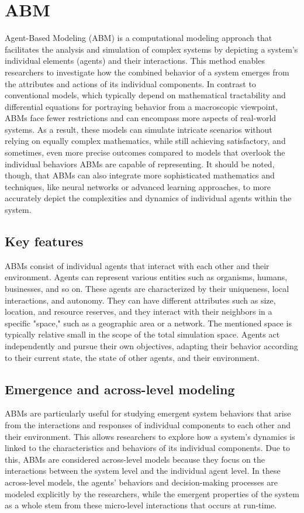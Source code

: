 \section{ABM}
    Agent-Based Modeling (ABM) is a computational modeling approach that facilitates the analysis and simulation of complex systems by depicting a system's individual elements (agents) and their interactions. This method enables researchers to investigate how the combined behavior of a system emerges from the attributes and actions of its individual components. In contrast to conventional models, which typically depend on mathematical tractability and differential equations for portraying behavior from a macroscopic viewpoint, ABMs face fewer restrictions and can encompass more aspects of real-world systems. As a result, these models can simulate intricate scenarios without relying on equally complex mathematics, while still achieving satisfactory, and sometimes, even more precise outcomes compared to models that overlook the individual behaviors ABMs are capable of representing. It should be noted, though, that ABMs can also integrate more sophisticated mathematics and techniques, like neural networks or advanced learning approaches, to more accurately depict the complexities and dynamics of individual agents within the system.

\subsection{Key features}
    ABMs consist of individual agents that interact with each other and their environment. Agents can represent various entities such as organisms, humans, businesses, and so on. These agents are characterized by their uniqueness, local interactions, and autonomy. They can have different attributes such as size, location, and resource reserves, and they interact with their neighbors in a specific "space," such as a geographic area or a network. The mentioned space is typically relative small in the scope of the total simulation space. Agents act independently and pursue their own objectives, adapting their behavior according to their current state, the state of other agents, and their environment.

\subsection{Emergence and across-level modeling}
    ABMs are particularly useful for studying emergent system behaviors that arise from the interactions and responses of individual components to each other and their environment. This allows researchers to explore how a system's dynamics is linked to the characteristics and behaviors of its individual components. Due to this, ABMs are considered across-level models because they focus on the interactions between the system level and the individual agent level. In these across-level models, the agents' behaviors and decision-making processes are modeled explicitly by the researchers, while the emergent properties of the system as a whole stem from these micro-level interactions that occurs at run-time.

